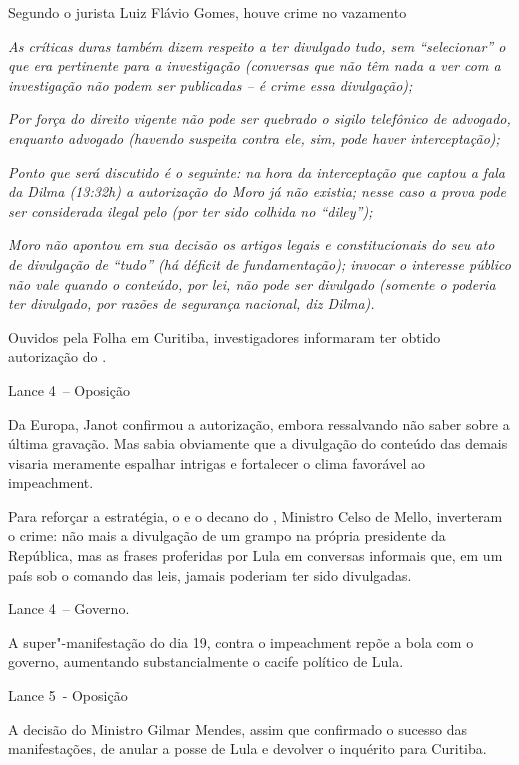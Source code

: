 Segundo o jurista Luiz Flávio Gomes, houve crime no vazamento

\emph{\redondo{[…]} As críticas duras também dizem respeito a ter
divulgado tudo, sem ``selecionar'' o que era pertinente para a
investigação (conversas que não têm nada a ver com a investigação não
podem ser publicadas -- é crime essa divulgação);}

\emph{\redondo{[…]} Por força do direito vigente não pode ser quebrado
o sigilo telefônico de advogado, enquanto advogado (havendo suspeita
contra ele, sim, pode haver interceptação);}

\emph{\redondo{[…]} Ponto que será discutido é o seguinte: na hora da
interceptação que captou a fala da Dilma (13:32h) a autorização do Moro
já não existia; nesse caso a prova pode ser considerada ilegal pelo 
(por ter sido colhida no ``diley'');}

\emph{\redondo{[…]} Moro não apontou em sua decisão os artigos legais e
constitucionais do seu ato de divulgação de ``tudo'' (há déficit de
fundamentação); invocar o interesse público não vale quando o conteúdo,
por lei, não pode ser divulgado (somente o  poderia ter divulgado,
por razões de segurança nacional, diz Dilma).}

Ouvidos pela Folha em Curitiba, investigadores informaram ter obtido
autorização do .

Lance 4~-- Oposição

Da Europa, Janot confirmou a autorização, embora ressalvando não saber
sobre a última gravação. Mas sabia obviamente que a divulgação do
conteúdo das demais visaria meramente espalhar intrigas e fortalecer o
clima favorável ao impeachment.

Para reforçar a estratégia, o  e o decano do , Ministro Celso de
Mello, inverteram o crime: não mais a divulgação de um grampo na própria
presidente da República, mas as frases proferidas por Lula em conversas
informais que, em um país sob o comando das leis, jamais poderiam ter
sido divulgadas.

Lance 4~-- Governo.

A super"-manifestação do dia 19, contra o impeachment repõe a bola com o
governo, aumentando substancialmente o cacife político de Lula.

Lance 5~- Oposição

A decisão do Ministro Gilmar Mendes, assim que confirmado o sucesso das
manifestações, de anular a posse de Lula e devolver o inquérito para
Curitiba.

